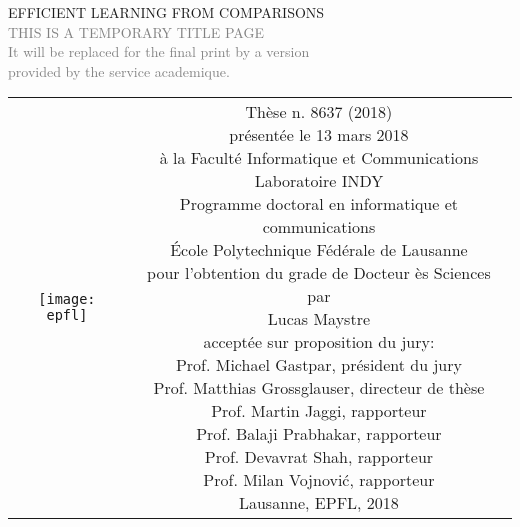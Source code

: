 \begin{titlepage}
\begin{center}
\sffamily


\null\vspace{2cm}
{\huge EFFICIENT LEARNING FROM COMPARISONS} \\[24pt] 
\textcolor{gray}{\small{THIS IS A TEMPORARY TITLE PAGE \\ It will be replaced for the final print by a version \\ provided by the service academique.}}
    
\vfill

\begin{tabular} {cc}
\parbox{0.3\textwidth}{\texttt{[image: epfl]}}
&
\parbox{0.7\textwidth}{%
	Thèse n. 8637 (2018)\\
	présentée le 13 mars 2018\\
	à la Faculté Informatique et Communications\\
	Laboratoire INDY\\
	Programme doctoral en informatique et communications\\
%
	École Polytechnique Fédérale de Lausanne\\[6pt]
	pour l'obtention du grade de Docteur ès Sciences\\
	par\\ [4pt]
	\null \hspace{3em} Lucas Maystre\\[9pt]
%
\small
acceptée sur proposition du jury:\\[4pt]
%
    Prof. Michael Gastpar, président du jury\\
    Prof. Matthias Grossglauser, directeur de thèse\\
    Prof. Martin Jaggi, rapporteur\\
    Prof. Balaji Prabhakar, rapporteur\\
    Prof. Devavrat Shah, rapporteur\\
    Prof. Milan Vojnović, rapporteur\\[12pt]
%
Lausanne, EPFL, 2018}
\end{tabular}
\end{center}
\vspace{2cm}
\end{titlepage}
